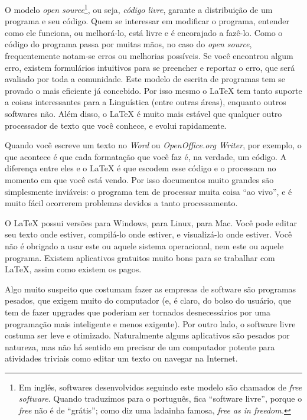O modelo \emph{open source}\footnote{Em inglês, softwares desenvolvidos seguindo este modelo são chamados de \emph{free software}. Quando traduzimos para o português, fica ``software livre'', porque o \emph{free} não é de ``grátis''; como diz uma ladainha famosa, \emph{free as in freedom.}}, ou seja, \emph{código livre}, garante a distribuição de um programa e seu código. Quem se interessar em modificar o programa, entender como ele funciona, ou melhorá-lo, está livre e é encorajado a fazê-lo. Como o código do programa passa por muitas mãos, no caso do \emph{open source}, frequentemente notam-se erros ou melhorias possíveis. Se você encontrou algum erro, existem formulários intuitivos para se preencher e reportar o erro, que será avaliado por toda a comunidade. Este modelo de escrita de programas tem se provado o mais eficiente já concebido. Por isso mesmo o \LaTeX{} tem tanto suporte a coisas interessantes para a Linguística (entre outras áreas), enquanto outros softwares não. Além disso, o \LaTeX{} é muito mais estável que qualquer outro processador de texto que você conhece, e evolui rapidamente.

Quando você escreve um texto no \emph{Word} ou \emph{OpenOffice.org Writer}, por exemplo, o que acontece é que cada formatação que você faz é, na verdade, um código. A diferença entre eles e o \LaTeX{} é que escodem esse código e o processam no momento em que você está vendo. Por isso documentos muito grandes são simplesmente inviáveis: o programa tem de processar muita coisa ``ao vivo'', e é muito fácil ocorrerem problemas devidos a tanto processamento.

O \LaTeX{} possui versões para Windows, para Linux, para Mac. Você pode editar seu texto onde estiver, compilá-lo onde estiver, e visualizá-lo onde estiver. Você não é obrigado a usar este ou aquele sistema operacional, nem este ou aquele programa. Existem aplicativos gratuitos muito bons para se trabalhar com \LaTeX{}, assim como existem os pagos.

Algo muito suspeito que costumam fazer as empresas de software são programas pesados, que exigem muito do computador (e, é claro, do bolso do usuário, que tem de fazer upgrades que poderiam ser tornados desnecessários por uma programação mais inteligente e menos exigente). Por outro lado, o software livre costuma ser leve e otimizado. Naturalmente alguns aplicativos são pesados por natureza, mas não há sentido em precisar de um computador potente para atividades triviais como editar um texto ou navegar na Internet. 

